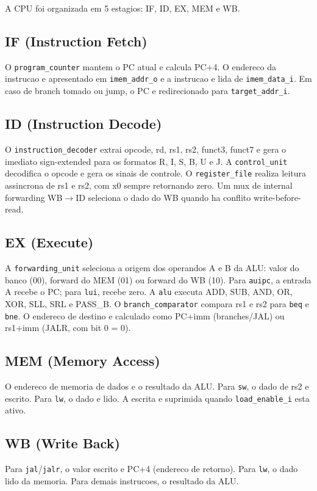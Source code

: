 \documentclass[12pt,a4paper]{article}
\begin{document}
A CPU foi organizada em 5 estagios: IF, ID, EX, MEM e WB.

\subsection{IF (Instruction Fetch)}
O \texttt{program\_counter} mantem o PC atual e calcula PC+4. O endereco da
instrucao e apresentado em \texttt{imem\_addr\_o} e a instrucao e lida de
\texttt{imem\_data\_i}. Em caso de branch tomado ou jump, o PC e redirecionado
para \texttt{target\_addr\_i}.

\subsection{ID (Instruction Decode)}
O \texttt{instruction\_decoder} extrai opcode, rd, rs1, rs2, funct3, funct7 e
gera o imediato sign-extended para os formatos R, I, S, B, U e J. A
\texttt{control\_unit} decodifica o opcode e gera os sinais de controle. O
\texttt{register\_file} realiza leitura assincrona de rs1 e rs2, com x0 sempre
retornando zero. Um mux de internal forwarding WB$\rightarrow$ID seleciona o
dado do WB quando ha conflito write-before-read.

\subsection{EX (Execute)}
A \texttt{forwarding\_unit} seleciona a origem dos operandos A e B da ALU:
valor do banco (00), forward do MEM (01) ou forward do WB (10). Para
\texttt{auipc}, a entrada A recebe o PC; para \texttt{lui}, recebe zero. A
\texttt{alu} executa ADD, SUB, AND, OR, XOR, SLL, SRL e PASS\_B. O
\texttt{branch\_comparator} compara rs1 e rs2 para \texttt{beq} e
\texttt{bne}. O endereco de destino e calculado como PC+imm (branches/JAL)
ou rs1+imm (JALR, com bit 0 = 0).

\subsection{MEM (Memory Access)}
O endereco de memoria de dados e o resultado da ALU. Para \texttt{sw}, o dado
de rs2 e escrito. Para \texttt{lw}, o dado e lido. A escrita e suprimida quando
\texttt{load\_enable\_i} esta ativo.

\subsection{WB (Write Back)}
Para \texttt{jal}/\texttt{jalr}, o valor escrito e PC+4 (endereco de retorno).
Para \texttt{lw}, o dado lido da memoria. Para demais instrucoes, o resultado
da ALU.
\end{document}
